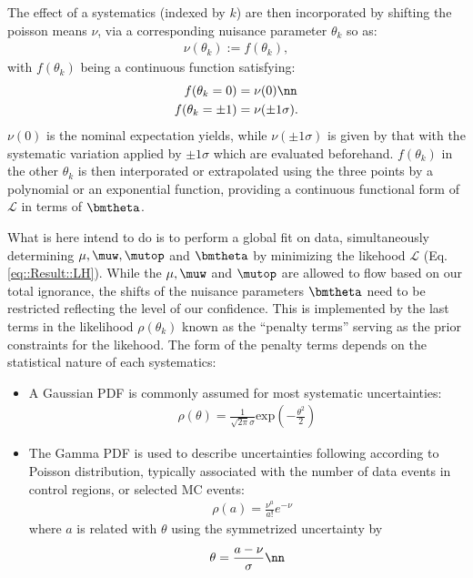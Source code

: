 The effect of a systematics (indexed by $k$) are then incorporated by shifting the poisson means $\nu$, via a corresponding nuisance parameter $\theta_k$ so as:
\begin{align}
        \nu(\theta_k) := f(\theta_k), 
\end{align}
with $f(\theta_k)$ being a continuous function satisfying:
\begin{align}
        f(\theta_k=0) & =  \nu(0)  \nn \\
        f(\theta_k=\pm1) & =  \nu(\pm1\sigma).
\end{align}
$\nu(0)$ is the nominal expectation yields, while $\nu(\pm1\sigma)$ is given by that with the systematic variation applied by $\pm1\sigma$ which are evaluated beforehand. $f(\theta_k)$ in the other $\theta_k$ is then interporated or extrapolated using the three points by a polynomial or an exponential function, providing a continuous functional form of $\mathcal{L}$ in terms of $\bmtheta$.

What is here intend to do is to perform a global fit on data, simultaneously determining $\mu, \muw, \mutop$ and $\bmtheta$ by minimizing the likehood $\mathcal{L}$ (Eq. \ref{eq::Result::LH}). While the $\mu, \muw$ and $\mutop$ are allowed to flow based on our total ignorance, the shifts of the nuisance parameters $\bmtheta$ need to be restricted reflecting the level of our confidence. This is implemented by the last terms in the likelihood $\rho(\theta_k)$ known as the ``penalty terms'' serving as the prior constraints for the likehood. The form of the penalty terms depends on the statistical nature of each systematics:
\begin{itemize}
\item A Gaussian PDF is commonly assumed for most systematic uncertainties:
\begin{align}
\rho (\theta) = \frac{1}{\sqrt{2\pi}\sigma} \mathrm{exp} \left( - \frac{\theta^2}{2} \right)
\end{align}


\item The Gamma PDF is used to describe uncertainties following according to Poisson distribution, typically associated with the number of data events in control regions, or selected MC events:
\begin{align}
& \rho (a) = \frac{\nu^a}{a!} e^{-\nu} 
\end{align}
where $a$ is related with $\theta$ using the symmetrized uncertainty by 
\begin{align}
& \theta = \frac{a-\nu}{\sigma} \nn \\
\end{align}
\end{itemize}

